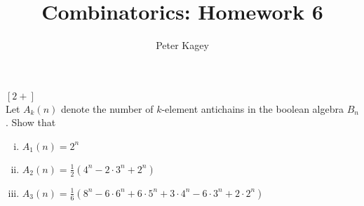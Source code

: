 \documentclass{article}
\newenvironment{problem}[2][Problem]{\begin{trivlist}
\item[\hskip \labelsep {\bfseries #1}\hskip \labelsep {\bfseries #2.}]}{\end{trivlist}}
\begin{document}
\title{Combinatorics: Homework 6}
\author{Peter Kagey}

\maketitle

\begin{problem}{14 (a)} $[2+]$ \\
  Let $A_k(n)$ denote the number of $k$-element antichains in the boolean algebra
  $B_n$. Show that \begin{enumerate}[(i)]
    \item $A_1(n) = 2^n$
    \item $A_2(n) = \displaystyle \frac{1}{2}(4^n - 2\cdot3^n + 2^n)$
    \item $A_3(n) = \displaystyle \frac{1}{6}(8^n - 6\cdot6^n + 6\cdot5^n + 3\cdot4^n - 6\cdot3^n + 2\cdot2^n)$
  \end{enumerate}
\end{problem}
\end{document}
